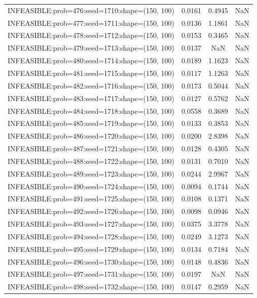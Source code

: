 \begin{longtable}{lccc}
INFEASIBLE:prob=476:seed=1710:shape=(150, 100) & 0.0161 &  0.4945 &    NaN \\
INFEASIBLE:prob=477:seed=1711:shape=(150, 100) & 0.0136 &  1.1861 &    NaN \\
INFEASIBLE:prob=478:seed=1712:shape=(150, 100) & 0.0153 &  0.3465 &    NaN \\
INFEASIBLE:prob=479:seed=1713:shape=(150, 100) & 0.0137 &     NaN &    NaN \\
INFEASIBLE:prob=480:seed=1714:shape=(150, 100) & 0.0189 &  1.1623 &    NaN \\
INFEASIBLE:prob=481:seed=1715:shape=(150, 100) & 0.0117 &  1.1263 &    NaN \\
INFEASIBLE:prob=482:seed=1716:shape=(150, 100) & 0.0173 &  0.5044 &    NaN \\
INFEASIBLE:prob=483:seed=1717:shape=(150, 100) & 0.0127 &  0.5762 &    NaN \\
INFEASIBLE:prob=484:seed=1718:shape=(150, 100) & 0.0558 &  0.3689 &    NaN \\
INFEASIBLE:prob=485:seed=1719:shape=(150, 100) & 0.0133 &  0.3853 &    NaN \\
INFEASIBLE:prob=486:seed=1720:shape=(150, 100) & 0.0200 &  2.8398 &    NaN \\
INFEASIBLE:prob=487:seed=1721:shape=(150, 100) & 0.0128 &  0.4305 &    NaN \\
INFEASIBLE:prob=488:seed=1722:shape=(150, 100) & 0.0131 &  0.7010 &    NaN \\
INFEASIBLE:prob=489:seed=1723:shape=(150, 100) & 0.0244 &  2.9967 &    NaN \\
INFEASIBLE:prob=490:seed=1724:shape=(150, 100) & 0.0094 &  0.1744 &    NaN \\
INFEASIBLE:prob=491:seed=1725:shape=(150, 100) & 0.0108 &  0.1371 &    NaN \\
INFEASIBLE:prob=492:seed=1726:shape=(150, 100) & 0.0098 &  0.0946 &    NaN \\
INFEASIBLE:prob=493:seed=1727:shape=(150, 100) & 0.0375 &  3.3778 &    NaN \\
INFEASIBLE:prob=494:seed=1728:shape=(150, 100) & 0.0249 &  3.1273 &    NaN \\
INFEASIBLE:prob=495:seed=1729:shape=(150, 100) & 0.0134 &  0.7184 &    NaN \\
INFEASIBLE:prob=496:seed=1730:shape=(150, 100) & 0.0148 &  0.4836 &    NaN \\
INFEASIBLE:prob=497:seed=1731:shape=(150, 100) & 0.0197 &     NaN &    NaN \\
INFEASIBLE:prob=498:seed=1732:shape=(150, 100) & 0.0147 &  0.2959 &    NaN \\

\end{longtable}
